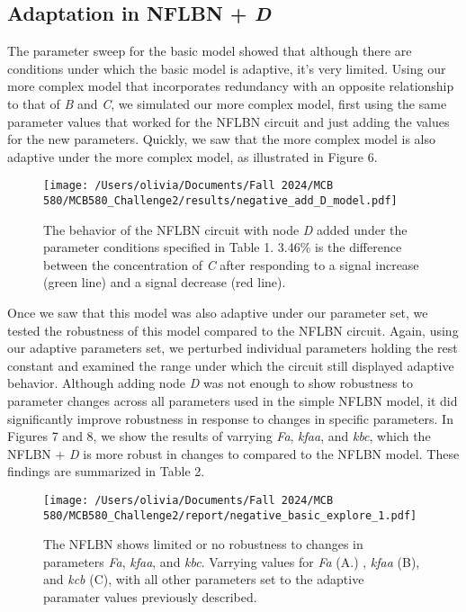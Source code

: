 \documentclass{article}
\begin{document}
\subsection{Adaptation in NFLBN + \textit{D}}

The parameter sweep for the basic model showed that although there are conditions under which the basic model is adaptive, it's very limited. Using our more complex model that incorporates redundancy with an opposite relationship to that of \textit{B} and \textit{C}, we simulated our more complex model, first using the same parameter values that worked for the NFLBN circuit and just adding the values for the new parameters. Quickly, we saw that the more complex model is also adaptive under the more complex model, as illustrated in Figure 6. 

\begin{figure}[H]
    \centering
    \texttt{[image: /Users/olivia/Documents/Fall 2024/MCB 580/MCB580\_Challenge2/results/negative\_add\_D\_model.pdf]}
    \caption{The behavior of the NFLBN circuit with node \textit{D} added under the parameter conditions specified in Table 1. 3.46\% is the difference between the concentration of \textit{C} after responding to a signal increase (green line) and a signal decrease (red line).}
    \label{fig:6}
\end{figure}

Once we saw that this model was also adaptive under our parameter set, we tested the robustness of this model compared to the NFLBN circuit. Again, using our adaptive parameters set, we perturbed individual parameters holding the rest constant and examined the range under which the circuit still displayed adaptive behavior. Although adding node \textit{D} was not enough to show robustness to parameter changes across all parameters used in the simple NFLBN model, it did significantly improve robustness in response to changes in specific parameters. In Figures 7 and 8, we show the results of varrying \textit{Fa}, \textit{kfaa}, and \textit{kbc}, which the NFLBN + \textit{D} is more robust in changes to compared to the NFLBN model. These findings are summarized in Table 2. 

\begin{figure}[H]
    \centering
    \texttt{[image: /Users/olivia/Documents/Fall 2024/MCB 580/MCB580\_Challenge2/report/negative\_basic\_explore\_1.pdf]}
    \caption{The NFLBN shows limited or no robustness to changes in parameters \textit{Fa}, \textit{kfaa}, and \textit{kbc}. Varrying values for \textit{Fa} (A.) , \textit{kfaa} (B), and \textit{kcb} (C), with all other parameters set to the adaptive paramater values previously described.}
    \label{fig:7}
\end{figure}
\end{document}
